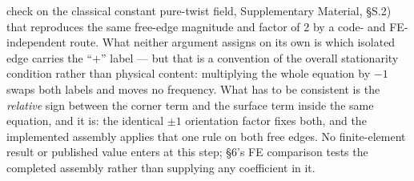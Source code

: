 \documentclass[11pt]{article}
\begin{document}
check on the classical constant pure-twist field, Supplementary
Material, §S.2) that reproduces the same free-edge magnitude and
factor of 2 by a code- and FE-independent route. What neither argument
assigns on its own is which isolated edge carries the ``$+$'' label --- but
that is a convention of the overall stationarity condition rather than
physical content: multiplying the whole equation by $-1$ swaps both labels
and moves no frequency. What has to be consistent is the \emph{relative}
sign between the corner term and the surface term inside the same
equation, and it is: the identical $\pm1$ orientation factor fixes both,
and the implemented assembly applies that one rule on both free edges. No
finite-element result or published value enters at this step; \S6's FE
comparison tests the completed assembly rather than supplying any
coefficient in it.
\end{document}
